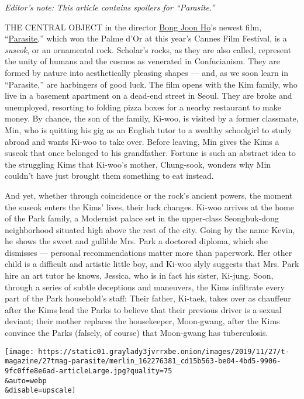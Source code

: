 \emph{Editor's note: This article contains spoilers for ``Parasite.''}

THE CENTRAL OBJECT in the director
\href{https://www.nytimes3xbfgragh.onion/2019/10/30/movies/bong-joon-ho-parasite.html}{Bong
Joon Ho}'s newest film,
``\href{https://www.nytimes3xbfgragh.onion/watching/titles/movies/890255}{Parasite},''
which won the Palme d'Or at this year's Cannes Film Festival, is a
\emph{suseok}, or an ornamental rock. Scholar's rocks, as they are also
called, represent the unity of humans and the cosmos as venerated in
Confucianism. They are formed by nature into aesthetically pleasing
shapes --- and, as we soon learn in ``Parasite,'' are harbingers of good
luck. The film opens with the Kim family, who live in a basement
apartment on a dead-end street in Seoul. They are broke and unemployed,
resorting to folding pizza boxes for a nearby restaurant to make money.
By chance, the son of the family, Ki-woo, is visited by a former
classmate, Min, who is quitting his gig as an English tutor to a wealthy
schoolgirl to study abroad and wants Ki-woo to take over. Before
leaving, Min gives the Kims a suseok that once belonged to his
grandfather. Fortune is such an abstract idea to the struggling Kims
that Ki-woo's mother, Chung-sook, wonders why Min couldn't have just
brought them something to eat instead.

And yet, whether through coincidence or the rock's ancient powers, the
moment the suseok enters the Kims' lives, their luck changes. Ki-woo
arrives at the home of the Park family, a Modernist palace set in the
upper-class Seongbuk-dong neighborhood situated high above the rest of
the city. Going by the name Kevin, he shows the sweet and gullible Mrs.
Park a doctored diploma, which she dismisses --- personal
recommendations matter more than paperwork. Her other child is a
difficult and artistic little boy, and Ki-woo slyly suggests that Mrs.
Park hire an art tutor he knows, Jessica, who is in fact his sister,
Ki-jung. Soon, through a series of subtle deceptions and maneuvers, the
Kims infiltrate every part of the Park household's staff: Their father,
Ki-taek, takes over as chauffeur after the Kims lead the Parks to
believe that their previous driver is a sexual deviant; their mother
replaces the housekeeper, Moon-gwang, after the Kims convince the Parks
(falsely, of course) that Moon-gwang has tuberculosis.

\texttt{[image: https://static01.graylady3jvrrxbe.onion/images/2019/11/27/t-magazine/27tmag-parasite/merlin\_162276381\_cd15b563-be04-4bd5-9906-9fc0ffe8e6ad-articleLarge.jpg?quality=75\\\&auto=webp\\\&disable=upscale]}

